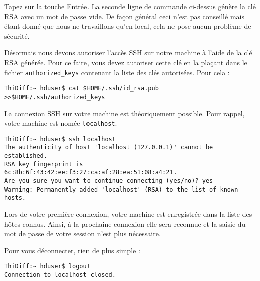 \par Tapez sur la touche Entrée. La seconde ligne de commande ci-dessus génère la clé RSA avec un mot de passe vide. De façon général ceci n'est pas conseillé mais étant donné que nous ne travaillons qu'en local, cela ne pose aucun problème de sécurité.

\par Désormais nous devons autoriser l'accès SSH sur notre machine à l'aide de la clé RSA générée. Pour ce faire, vous devez autoriser cette clé en la plaçant dans le fichier \texttt{authorized\_keys} contenant la liste des clés autorisées. Pour cela :

\begin{verbatim}
ThiDiff:~ hduser$ cat $HOME/.ssh/id_rsa.pub >>$HOME/.ssh/authorized_keys
\end{verbatim}

\par La connexion SSH sur votre machine est théoriquement possible. Pour rappel, votre machine est nomée \texttt{localhost}.

\begin{verbatim}
ThiDiff:~ hduser$ ssh localhost
The authenticity of host 'localhost (127.0.0.1)' cannot be established.
RSA key fingerprint is 6c:8b:6f:43:42:ee:f3:27:ca:af:28:ea:51:08:a4:21.
Are you sure you want to continue connecting (yes/no)? yes
Warning: Permanently added 'localhost' (RSA) to the list of known hosts.
\end{verbatim}

\par Lors de votre première connexion, votre machine est enregistrée dans la liste des hôtes connus. Ainsi, à la prochaine connexion elle sera reconnue et la saisie du mot de passe de votre session n'est plus nécessaire. 

\par Pour vous déconnecter, rien de plus simple :

\begin{verbatim}
ThiDiff:~ hduser$ logout
Connection to localhost closed.
\end{verbatim}

